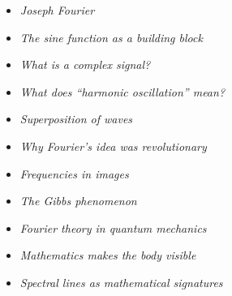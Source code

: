 \begin{HistoryBox}
	\begin{itemize}
		\item \emph{Joseph Fourier}\dotfill \pageref{box:fourier-joseph-fourier}
	\end{itemize}
\end{HistoryBox}

\begin{MathBox}
	\begin{itemize}
		\item \emph{The sine function as a building block}\dotfill \pageref{box:fourier-sinus-grundbaustein}
	\end{itemize}
\end{MathBox}

\begin{DidacticBox}
	\begin{itemize}
		\item \emph{What is a complex signal?}\dotfill \pageref{box:fourier-komplexes-signal}
		\item \emph{What does ``harmonic oscillation'' mean?}\dotfill \pageref{box:fourier-harmonische-schwingung}
		\item \emph{Superposition of waves}\dotfill \pageref{box:fourier-ueberlagerung-wellen}
		\item \emph{Why Fourier's idea was revolutionary}\dotfill \pageref{box:fourier-revolutionaere-idee}
		\item \emph{Frequencies in images}\dotfill \pageref{box:fourier-frequenzen-in-bildern}
		\item \emph{The Gibbs phenomenon}\dotfill \pageref{box:fourier-gibbs-phaenomen}
		\item \emph{Fourier theory in quantum mechanics}\dotfill \pageref{box:fourier-quantenmechanik}
	\end{itemize}
\end{DidacticBox}

\begin{PhysicsBox}
	\begin{itemize}
		\item \emph{Mathematics makes the body visible}\dotfill \pageref{box:fourier-medizinische-bildgebung}
		\item \emph{Spectral lines as mathematical signatures}\dotfill \pageref{box:fourier-spektrallinien-signatur}
	\end{itemize}
\end{PhysicsBox}

